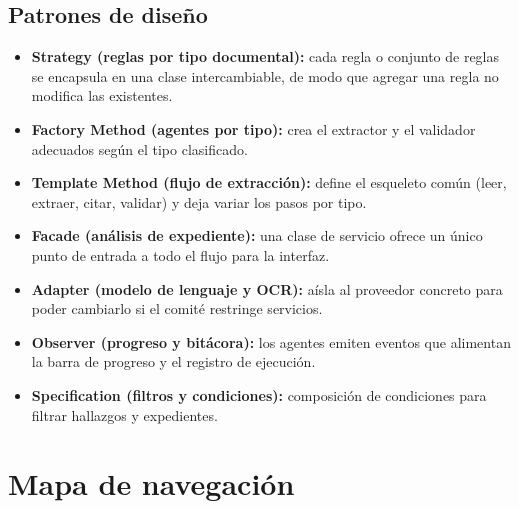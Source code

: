 \documentclass[11pt, a4paper]{article}
\begin{document}
\subsection*{Patrones de diseño}
\begin{itemize}
    \item \textbf{Strategy (reglas por tipo documental):} cada regla o conjunto de reglas se encapsula en una clase intercambiable, de modo que agregar una regla no modifica las existentes.
    \item \textbf{Factory Method (agentes por tipo):} crea el extractor y el validador adecuados según el tipo clasificado.
    \item \textbf{Template Method (flujo de extracción):} define el esqueleto común (leer, extraer, citar, validar) y deja variar los pasos por tipo.
    \item \textbf{Facade (análisis de expediente):} una clase de servicio ofrece un único punto de entrada a todo el flujo para la interfaz.
    \item \textbf{Adapter (modelo de lenguaje y OCR):} aísla al proveedor concreto para poder cambiarlo si el comité restringe servicios.
    \item \textbf{Observer (progreso y bitácora):} los agentes emiten eventos que alimentan la barra de progreso y el registro de ejecución.
    \item \textbf{Specification (filtros y condiciones):} composición de condiciones para filtrar hallazgos y expedientes.
\end{itemize}

\section{Mapa de navegación}
\end{document}
